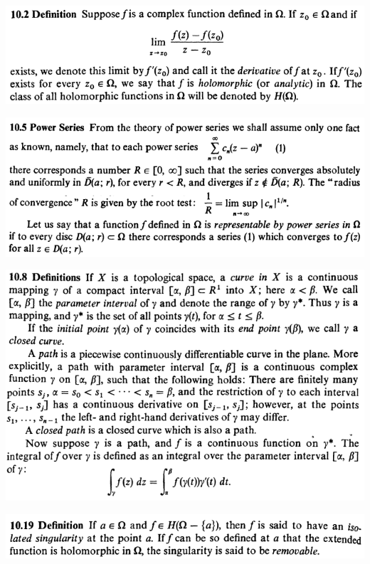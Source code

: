 \documentclass[12pt]{article}
\begin{document}
		\begin{center}
		\includegraphics{d10ponto2}
		\end{center}

		\begin{center}
		\includegraphics[scale=0.9]{d10ponto5}
		\end{center}

		\begin{center}
		\includegraphics{d10ponto8}
		\end{center}

		\begin{center}
		\includegraphics{d10ponto19}
		\end{center}
\end{document}
